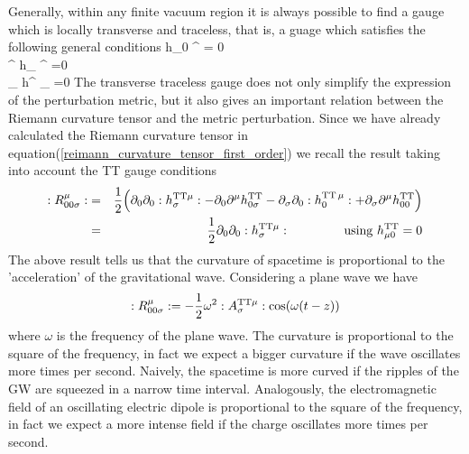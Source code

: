 Generally, within any finite vacuum region it is always possible to find a gauge which is locally transverse and traceless, that is, a guage which satisfies the following general conditions
\bea
h_{0 \nu} ^{\T} = 0 \\
\eta ^{\mu \nu} h_{\mu \nu} ^{\T} =0 \\
\partial_{\mu} h^{\mu \nu} _{\T} =0
\eea
The transverse traceless gauge does not only simplify the expression of the perturbation metric, but it also gives an important relation between the Riemann curvature tensor and the metric perturbation.
Since we have already calculated the Riemann curvature tensor in equation(\ref{reimann_curvature_tensor_first_order}) we recall the result taking into account the TT gauge conditions
\begin{eqnarray}
:R^\mu _{00 \sigma }: 
&=&
\dfrac{1}{2} \qty(
\partial_0 \partial_0 :h^{\text{TT} \mu} _{\sigma}: -
\partial_0 \partial^\mu h^{\text{TT}}_{0 \sigma} -
\partial_\sigma \partial_0 :h^{\text{TT} \,\mu} _{ 0}:  +
\partial_\sigma \partial^\mu h_{0 0} ^{\text{TT}}
) \notag
\\
&=&
\label{reimann_tensor_TT}
\dfrac{1}{2} \partial_0 \partial_0 :h^{\text{TT} \mu} _{\sigma}: 
\hspace{1.5cm} \text{using } h^{\text{TT}} _{\mu 0} =0 
\end{eqnarray}
The above result tells us that the curvature of spacetime is proportional to the 'acceleration' of the gravitational wave. 
Considering a plane wave we have
\[
 :R^\mu _{00 \sigma }: = -\dfrac{1}{2} \omega^2 :A^{\text{TT} \mu} _{\sigma}: \cos (\omega (t-z))
\]
where $\omega$ is the frequency of the plane wave. 
The curvature is proportional to the square of the frequency, in fact we expect a bigger curvature if the wave oscillates more times per second. 
Naively, the spacetime is more curved if the ripples of the GW are squeezed in a narrow time interval.
Analogously, the electromagnetic field of an oscillating electric dipole is proportional to the square of the frequency, in fact we expect a more intense  field if the charge oscillates more times per second.


